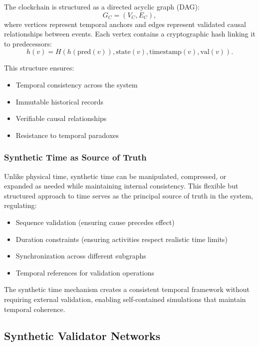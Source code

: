 \documentclass[11pt,a4paper]{article}
\begin{document}
The clockchain is structured as a directed acyclic graph (DAG):
\begin{equation}
G_C = (V_C, E_C),
\end{equation}
where vertices represent temporal anchors and edges represent validated causal relationships between events. Each vertex contains a cryptographic hash linking it to predecessors:
\begin{equation}
h(v) = H(h(\text{pred}(v)), \text{state}(v), \text{timestamp}(v), \text{val}(v)).
\end{equation}

This structure ensures:
\begin{itemize}
\item Temporal consistency across the system
\item Immutable historical records
\item Verifiable causal relationships
\item Resistance to temporal paradoxes
\end{itemize}

\subsubsection{Synthetic Time as Source of Truth}

Unlike physical time, synthetic time can be manipulated, compressed, or expanded as needed while maintaining internal consistency. This flexible but structured approach to time serves as the principal source of truth in the system, regulating:
\begin{itemize}
\item Sequence validation (ensuring cause precedes effect)
\item Duration constraints (ensuring activities respect realistic time limits)
\item Synchronization across different subgraphs
\item Temporal references for validation operations
\end{itemize}

The synthetic time mechanism creates a consistent temporal framework without requiring external validation, enabling self-contained simulations that maintain temporal coherence.

\subsection{Synthetic Validator Networks}
\end{document}
